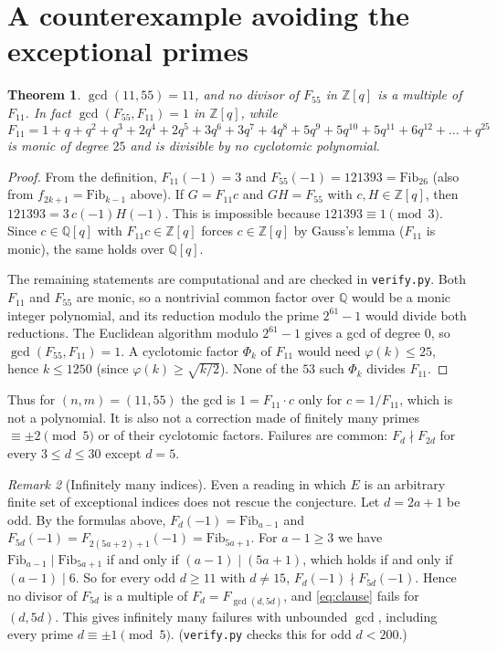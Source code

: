 \documentclass[11pt]{article}
\newtheorem{theorem}{Theorem}
\theoremstyle{remark}
\newtheorem{remark}[theorem]{Remark}
\begin{document}
\section{A counterexample avoiding the exceptional primes}\label{sec:11}

\begin{theorem}\label{thm:11}
$\gcd(11,55)=11$, and no divisor of $F_{55}$ in $\mathbb Z[q]$ is a multiple of
$F_{11}$. In fact $\gcd(F_{55},F_{11})=1$ in $\mathbb Z[q]$, while
\[
F_{11}=1+q+q^2+q^3+2q^4+2q^5+3q^6+3q^7+4q^8+5q^9+5q^{10}+5q^{11}+6q^{12}+\dots+q^{25}
\]
is monic of degree $25$ and is divisible by no cyclotomic polynomial.
\end{theorem}
\begin{proof}
From the definition, $F_{11}(-1)=3$ and $F_{55}(-1)=121393=\mathrm{Fib}_{26}$
(also from $f_{2k+1}=\mathrm{Fib}_{k-1}$ above). If $G=F_{11}c$ and $GH=F_{55}$
with $c,H\in\mathbb Z[q]$, then $121393=3\,c(-1)H(-1)$. This is impossible
because $121393\equiv1\pmod 3$. Since $c\in\mathbb Q[q]$ with $F_{11}c\in\mathbb
Z[q]$ forces $c\in\mathbb Z[q]$ by Gauss's lemma ($F_{11}$ is monic), the same
holds over $\mathbb Q[q]$.

The remaining statements are computational and are checked in
\texttt{verify.py}. Both $F_{11}$ and $F_{55}$ are monic, so a nontrivial common
factor over $\mathbb Q$ would be a monic integer polynomial, and its reduction
modulo the prime $2^{61}-1$ would divide both reductions. The Euclidean
algorithm modulo $2^{61}-1$ gives a gcd of degree $0$, so
$\gcd(F_{55},F_{11})=1$. A cyclotomic factor $\Phi_k$ of $F_{11}$ would need
$\varphi(k)\le25$, hence $k\le1250$ (since $\varphi(k)\ge\sqrt{k/2}$). None of
the $53$ such $\Phi_k$ divides $F_{11}$.
\end{proof}

Thus for $(n,m)=(11,55)$ the gcd is $1=F_{11}\cdot c$ only for $c=1/F_{11}$,
which is not a polynomial. It is also not a correction made of finitely many
primes $\equiv\pm2\pmod5$ or of their cyclotomic factors. Failures are common:
$F_d\nmid F_{2d}$ for every $3\le d\le30$ except $d=5$.

\begin{remark}[Infinitely many indices]\label{rem:5d}
Even a reading in which $E$ is an arbitrary finite set of exceptional
indices does not rescue the conjecture. Let $d=2a+1$ be odd. By the formulas
above, $F_d(-1)=\mathrm{Fib}_{a-1}$ and $F_{5d}(-1)=F_{2(5a+2)+1}(-1)=\mathrm{Fib}_{5a+1}$.
For $a-1\ge3$ we have $\mathrm{Fib}_{a-1}\mid\mathrm{Fib}_{5a+1}$ if and only if
$(a-1)\mid(5a+1)$, which holds if and only if $(a-1)\mid 6$. So for every odd
$d\ge11$ with $d\ne15$, $F_d(-1)\nmid F_{5d}(-1)$. Hence no divisor of $F_{5d}$ is a
multiple of $F_d=F_{\gcd(d,5d)}$, and \eqref{eq:clause} fails for $(d,5d)$. This
gives infinitely many failures with unbounded $\gcd$, including every prime
$d\equiv\pm1\pmod5$. (\texttt{verify.py} checks this for odd $d<200$.)
\end{remark}
\end{document}
